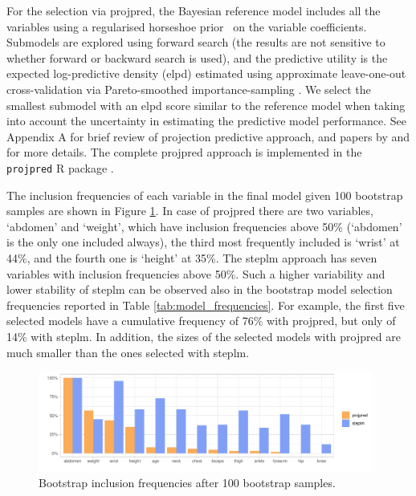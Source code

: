 \documentclass[a4]{article}
\theoremstyle{definition}
\begin{document}
For the selection via projpred, the Bayesian reference model includes
all the variables using a regularised horseshoe prior~\citep{paper:rhs} on the
variable coefficients. Submodels are explored using
forward search (the results are not sensitive to whether forward or
backward search is used), and the predictive utility is the expected
log-predictive density (elpd) estimated using approximate leave-one-out cross-validation via Pareto-smoothed importance-sampling
\citep[PSIS-LOO-CV; ][]{paper:psis_loo}.  We select the smallest  submodel with an elpd score similar to the reference model
when taking into account the uncertainty in estimating the predictive
model performance. See Appendix A for brief review of projection
predictive approach, and papers by \citet{paper:model_selection} and
\citet{paper:projpred} for more details. The complete projpred approach is implemented in the \texttt{projpred} R package \citep{Rprojpred}.

The inclusion frequencies of each variable in the final model given 100
bootstrap samples are shown in Figure
\ref{fig:inclusion_frequencies}. In case of projpred there are two
variables, `abdomen' and `weight', which have inclusion frequencies
above 50\% (`abdomen' is the only one included always), the third most
frequently included is `wrist' at 44\%, and the fourth one is `height'
at 35\%.  The steplm approach has seven variables with inclusion
frequencies above 50\%. Such a higher variability and lower stability
of steplm can be observed also in the bootstrap model selection
frequencies reported in Table \ref{tab:model_frequencies}. For
example, the first five selected models have a cumulative frequency of
76\% with projpred, but only of 14\% with steplm. In addition, the
sizes of the selected models with projpred are much smaller than the ones 
selected with steplm.
\begin{figure}[tp]
  \centering
  \includegraphics[width=0.98\textwidth]{graphics/inc_prob.pdf}
  \caption{Bootstrap inclusion frequencies after 100 bootstrap samples.}
  \label{fig:inclusion_frequencies}
\end{figure}
\end{document}
